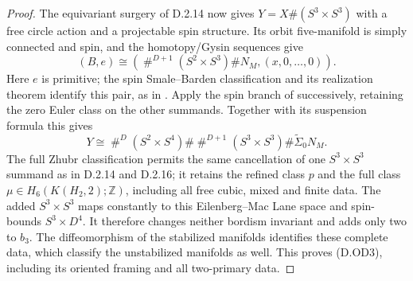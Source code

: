 \begin{proof}
The equivariant surgery of D.2.14 now gives
$Y=X\#(S^3\times S^3)$ with a free circle action and a
projectable spin structure. Its orbit five-manifold is
simply connected and spin, and the homotopy/Gysin sequences
give
\[
 (B,e)\cong
 \left(\mathop{\#}^{D+1}(S^2\times S^3)\#N_M,
                        (x,0,\ldots,0)\right).
\]
Here $e$ is primitive; the spin Smale--Barden classification
and its realization theorem identify this pair, as in
\cite[Theorems 2.2--2.3]{manBarden65}.
Apply the spin branch of \cite[Theorem A]{manGR25}
successively, retaining the zero Euler class on the other
summands. Together with its suspension formula this gives
\[
 Y\cong\mathop{\#}^{D}(S^2\times S^4)
       \#\mathop{\#}^{D+1}(S^3\times S^3)
       \#\widetilde\Sigma_0N_M.
\]
The full Zhubr classification permits the same cancellation
of one $S^3\times S^3$ summand as in D.2.14 and D.2.16;
it retains the refined class $p$ and the full class
$\mu\in H_6(K(H_2,2);\mathbb Z)$, including all free cubic,
mixed and finite data. The added $S^3\times S^3$ maps
constantly to this Eilenberg--Mac Lane space and spin-bounds
$S^3\times D^4$. It therefore changes neither bordism
invariant and adds only two to $b_3$. The diffeomorphism of
the stabilized manifolds identifies these complete data,
which classify the unstabilized manifolds as well.
This proves (D.OD3), including its oriented framing and
all two-primary data.
\end{proof}
